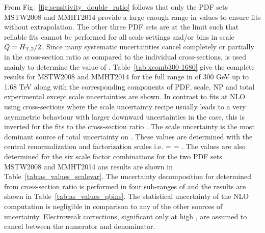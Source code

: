 From Fig.~\ref{fig:sensitivity_double_ratio} follows that only the PDF sets MSTW2008 and MMHT2014 provide a large enough range in \alpsmz values to ensure fits without extrapolation. The other three PDF sets are at the limit such that reliable fits cannot be performed for all scale settings and/or bins in scale $Q=H_{\mathrm{T,2}}/2$. Since many systematic uncertainties cancel completely or partially in the cross-section ratio \ratio as compared to the individual cross-sections, \ratio is used mainly to determine the value of \alpsmz. Table~\ref{tab:xcomb300-1680} give the complete results for MSTW2008 and MMHT2014 for the full range in \httwo of 300 GeV up to 1.68 TeV along with the corresponding components of PDF, scale, NP and total experimental except scale uncertainties are shown. In contrast to fits at NLO using cross-sections where the scale uncertainty recipe usually leads to a very asymmetric behaviour with larger downward uncertainties in the case, this is inverted for the fits to the cross-section ratio \ratio. The scale uncertainty is the most dominant source of total uncertainty on \alpsmz. These values are determined with the central renormalization and factorization scales i.e. \mur = \muf = \httwo. The values are also determined for the six scale factor combinations for the two PDF sets MSTW2008 and MMHT2014 ans results are shown in Table~\ref{tab:as_values_scalevar}. The uncertainty decomposition for \alpsmz determined from cross-section ratio \ratio is performed in four sub-ranges of \httwo and the results are shown in Table~\ref{tab:as_values_qbins}. The statistical uncertainty of the NLO computation is negligible in comparison to any of the other sources of uncertainty. Electroweak corrections, significant only at high \httwo, are assumed to cancel between the numerator and denominator. 
%
%
%
